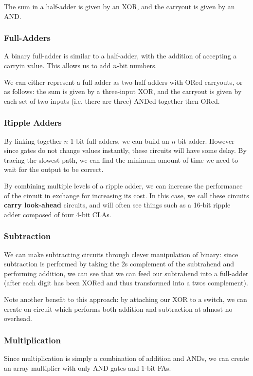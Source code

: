 \documentclass[12pt]{article}
\begin{document}
The sum in a half-adder is given by an XOR, and the carryout is given by an AND.

\subsubsection*{Full-Adders}
A binary full-adder is similar to a half-adder, with the addition of accepting a carryin value. This allows us to add $n$-bit numbers.

We can either represent a full-adder as two half-adders with ORed carryouts, or as follows: the sum is given by a three-input XOR, and the carryout is given by each set of two inputs (i.e. there are three) ANDed together then ORed.

\subsubsection*{Ripple Adders}
By linking together $n$ 1-bit full-adders, we can build an $n$-bit adder. However since gates do not change values instantly, these circuits will have some delay. By tracing the slowest path, we can find the minimum amount of time we need to wait for the output to be correct.

By combining multiple levels of a ripple adder, we can increase the performance of the circuit in exchange for increasing its cost. In this case, we call these circuits {\bf carry look-ahead} circuits, and will often see things such as a 16-bit ripple adder composed of four 4-bit CLAs.

\subsubsection*{Subtraction}
We can make subtracting circuits through clever manipulation of binary: since subtraction is performed by taking the 2s complement of the subtrahend and performing addition, we can see that we can feed our subtrahend into a full-adder (after each digit has been XORed and thus transformed into a twos complement).

Note another benefit to this approach: by attaching our XOR to a switch, we can create on circuit which performs both addition and subtraction at almost no overhead.

\subsubsection*{Multiplication}
Since multiplication is simply a combination of addition and ANDs, we can create an array multiplier with only AND gates and 1-bit FAs.
\end{document}
